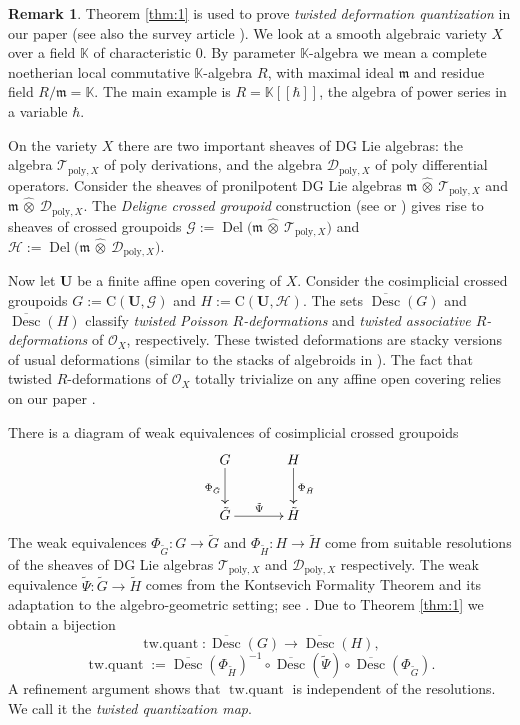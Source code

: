 \documentclass[a4paper,10pt]{amsart}
\theoremstyle{definition}
\newtheorem{rem}[equation]{Remark}
\numberwithin{equation}{section}
\newcommand{\opn}{\operatorname}
\newcommand{\ol}{\overline}
\newcommand{\mfrak}[1]{\mathfrak{#1}}
\newcommand{\mcal}[1]{\mathcal{#1}}
\newcommand{\mrm}[1]{\mathrm{#1}}
\newcommand{\mbb}[1]{\mathbb{#1}}
\newcommand{\bsym}[1]{\boldsymbol{#1}}
\newcommand{\hatotimes}[1]{\, \what{{\otimes}}_{#1} \,}
\newcommand{\hot}{\hatotimes{}}
\newcommand{\til}[1]{\tilde{#1}}
\newcommand{\what}[1]{\widehat{#1}}
\newcommand{\K}{\mbb{K}}
\newcommand{\m}{\mfrak{m}}
\newcommand{\gerbe}[1]{\bsym{\mcal{#1}}}
\begin{document}
\begin{rem} \label{rem:12}
Theorem \ref{thm:1} is used to prove {\em twisted deformation quantization} in
our paper \cite{Ye1} (see also the survey article \cite{Ye3}). We look at a
smooth algebraic variety $X$ over a field $\K$ of characteristic $0$.
By parameter $\K$-algebra we mean a complete noetherian local commutative 
$\K$-algebra $R$, with maximal ideal $\m$ and residue field 
$R / \m = \K$. The main example is $R = \K[[\hbar]]$, the algebra of
power series in a variable $\hbar$. 

On the variety $X$ there are two important sheaves of DG Lie algebras: the
algebra $\mcal{T}_{\mrm{poly}, X}$ of poly derivations, and the algebra 
$\mcal{D}_{\mrm{poly}, X}$ of poly differential operators. 
Consider the sheaves of pronilpotent DG Lie algebras
$\m \hot \mcal{T}_{\mrm{poly}, X}$ and 
$\m \hot \mcal{D}_{\mrm{poly}, X}$. The {\em Deligne crossed groupoid}
construction (see \cite{Ge} or \cite{Ye2}) gives rise to 
sheaves of crossed groupoids 
$\gerbe{G} := \opn{Del} \bigl( \m \hot \mcal{T}_{\mrm{poly}, X} \bigr)$
and
$\gerbe{H}:= \opn{Del} \bigl( \m \hot \mcal{D}_{\mrm{poly}, X} \bigr)$.

Now let $\bsym{U}$ be a finite affine open covering of $X$. 
Consider the cosimplicial crossed groupoids 
$G := \mrm{C}(\bsym{U} , \gerbe{G})$
and 
$H := \mrm{C}(\bsym{U} , \gerbe{H})$.
The sets $\ol{\opn{Desc}}(G)$ and $\ol{\opn{Desc}}(H)$
classify {\em twisted Poisson $R$-deformations} and {\em
twisted associative $R$-deformations} of $\mcal{O}_X$, respectively.
These twisted deformations are stacky versions of usual deformations 
(similar to the stacks of algebroids in \cite{Ko, KS}). The fact that twisted
$R$-deformations of $\mcal{O}_X$ totally trivialize on any affine open covering 
relies on our paper \cite{Ye4}.

There is a diagram of weak equivalences of cosimplicial crossed groupoids
\[ \UseTips \xymatrix @C=8ex @R=6ex {
G
\ar[d]_{\Phi_{\til{G}}}
&
H
\ar[d]^{\Phi_{\til{H}}}
\\
\til{G}
\ar[r]^{\til{\Psi}}
&
\til{H}
} \]
The weak equivalences $\Phi_{\til{G}} : G \to \til{G}$ and
$\Phi_{\til{H}} : H \to \til{H}$ come from suitable 
resolutions of the sheaves of DG Lie algebras 
$\mcal{T}_{\mrm{poly}, X}$ and $\mcal{D}_{\mrm{poly}, X}$ respectively. The 
weak equivalence $\til{\Psi} : \til{G} \to \til{H}$ comes from the Kontsevich 
Formality Theorem and its adaptation to the algebro-geometric setting; see 
\cite[Theorems 10.3 and 10.6]{Ye1}. Due to Theorem \ref{thm:1} we obtain a 
bijection  
\[ \opn{tw{.}quant} : \ol{\opn{Desc}}(G) \to \ol{\opn{Desc}}(H) , \]
\[ \opn{tw{.}quant} := \ol{\opn{Desc}}(\Phi_{\til{H}})^{-1} \circ 
\ol{\opn{Desc}}(\til{\Psi}) \circ \ol{\opn{Desc}}(\Phi_{\til{G}}) . \]
A refinement argument shows that $\opn{tw{.}quant}$ is independent of the 
resolutions. We call it the {\em twisted quantization map}. 
 

\end{rem}
\end{document}
